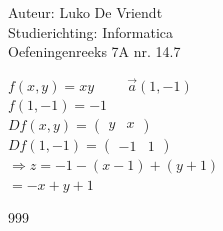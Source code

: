 \documentclass[a4paper]{article}
\begin{document}
\noindent \large Auteur: Luko De Vriendt\\
\noindent \large Studierichting: Informatica\\
\noindent \large Oefeningenreeks 7A nr. 14.7\\

\medskip

\normalsize

$f(x,y) = xy \hspace{1cm} \vec{a} (1,-1)$ \\

$f(1,-1) = -1$ \\

$Df(x,y) =
\left(
\begin{array}{cc}
	y & x
\end{array}
\right)$ \\

$Df(1,-1) =
\left(
\begin{array}{cc}
	-1 & 1
\end{array}
\right)$ \\

$\Rightarrow z = -1 -(x-1) +(y+1)$ \\

$= -x +y +1$ \\

\begin{thebibliography}{999}
\end{thebibliography}
\end{document}
